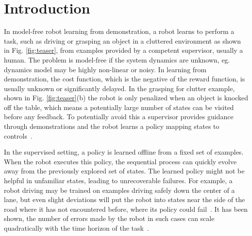 \documentclass[10pt, conference]{ieeeconf}      %
\begin{document}

\section{Introduction} 


In model-free robot learning from demonstration, a robot learns to perform a task, such as driving or grasping an object in a cluttered environment as shown in Fig. \ref{fig:teaser}, from examples provided by a competent supervisor, usually a human. The problem is model-free if  the system dynamics are unknown, eg. dynamics model may be highly non-linear or noisy. In learning from demonstration, the cost function, which is the negative of the reward function, is usually unknown or significantly delayed. In the grasping for clutter example, shown in Fig. \ref{fig:teaser}(b) the robot is only penalized when an object is knocked off the table, which means a potentially large number of states can be visited before any feedback. To potentially avoid this a supervisor provides guidance through demonstrations and the robot learns a policy mapping states to controls~\cite{argall2009survey}.  

In the supervised setting, a policy is learned offline from a fixed set of examples. When the robot executes this policy, the sequential process can quickly evolve away from the previously explored set of states.  The learned policy might not be helpful in unfamiliar states, leading to unrecoverable failures.  For example, a robot driving may be trained on examples driving safely down the center of a lane, but even slight deviations will put the robot into states near the side of the road where it has not encountered before, where its policy could  fail~\cite{pomerleau1989alvinn}. It has been shown, the number of errors made by the robot in such cases  can scale quadratically with the time horizon of the task~\cite{ross2010efficient}.
\end{document}
